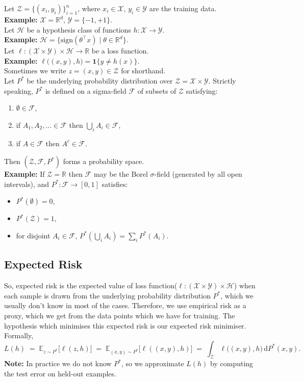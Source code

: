 \documentclass[11pt]{article}
\theoremstyle{plain} %
\begin{document}
\vspace{5 mm}
Let $\mathcal{Z}=\{(x_i,y_i)\}_{i=1}^n$, where $x_i\in\mathcal{X}$, $y_i\in\mathcal{Y}$ are the training data.\\
\textbf{Example:} $\mathcal{X}=\mathbb{R}^d$, $\mathcal{Y}=\{-1,+1\}$.\\

Let $\mathcal{H}$ be a hypothesis class of functions $h:\mathcal{X}\to\mathcal{Y}$.\\
\textbf{Example:} $\mathcal{H}=\{\mathrm{sign}(\theta^\top x)\mid\theta\in\mathbb{R}^d\}$.\\

Let $\ell:(\mathcal{X}\times\mathcal{Y})\times\mathcal{H}\to\mathbb{R}$ be a loss function.\\
\textbf{Example:} $\displaystyle \ell\bigl((x,y),h\bigr)=\mathbf{1}\{y\neq h(x)\}$.\\

Sometimes we write $z=(x,y)\in\mathcal{Z}$ for shorthand.\\

Let $P^*$ be the underlying probability distribution over $\mathcal{Z}=\mathcal{X}\times\mathcal{Y}$.  
Strictly speaking, $P^*$ is defined on a sigma-field $\mathcal{F}$ of subsets of $\mathcal{Z}$ satisfying:
\begin{enumerate}
  \item $\emptyset\in\mathcal{F}$,
  \item if $A_1,A_2,\dots\in\mathcal{F}$ then $\bigcup_i A_i\in\mathcal{F}$,
  \item if $A\in\mathcal{F}$ then $A^c\in\mathcal{F}$.
\end{enumerate}
Then $(\mathcal{Z},\mathcal{F},P^*)$ forms a probability space.\\
\textbf{Example:} If $\mathcal{Z}=\mathbb{R}$ then $\mathcal{F}$ may be the Borel $\sigma$-field (generated by all open intervals), and $P^*:\mathcal{F}\to[0,1]$ satisfies:
\begin{itemize}
  \item $P^*(\emptyset)=0$,
  \item $P^*(\mathcal{Z})=1$,
  \item for disjoint $A_i\in\mathcal{F}$, $P^*(\bigcup_i A_i)=\sum_i P^*(A_i)$.
\end{itemize}

\subsection{Expected Risk}
So, expected risk is the expected value of loss function($\ell:(\mathcal{X}\times\mathcal{Y})\times\mathcal{H}$)  when each sample is drawn from the underlying probability distribution $P^*$, which we usually don't know in most of the cases.
Therefore, we use empirical risk as a proxy, which we get from the data points which we have for training.
The hypothesis which minimises this expected risk is our expected risk minimiser.
Formally, 
\[
  L(h)
  \;=\;
  \mathbb{E}_{z \sim P^*}\bigl[\ell(z,h)\bigr]
  \;=\;\mathbb{E}_{(x,y) \sim P^*}\bigl[\ell((x,y),h)\bigr] \;=\;
  \int_{\mathcal{Z}}\ell\bigl((x,y),h\bigr)\,\mathrm{d}P^*(x,y).
\]
\textbf{Note:} In practice we do not know $P^*$, so we approximate $L(h)$ by computing the test error on held‐out examples.
\end{document}
